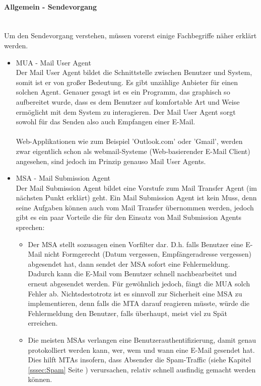 \documentclass[12pt,a4paper]{report}
\begin{document}
\begin{onehalfspace}
\paragraph{Allgemein - Sendevorgang\\\\}
Um den Sendevorgang verstehen, müssen vorerst einige Fachbegriffe näher erklärt werden.
\begin{itemize}
\item MUA - Mail User Agent\\\label{itm:MUA}
Der Mail User Agent bildet die Schnittstelle zwischen Benutzer und System, somit ist er von großer Bedeutung. Es gibt unzählige Anbieter für einen solchen Agent. Genauer gesagt ist es ein Programm, das graphisch so aufbereitet wurde, dass es dem Benutzer auf komfortable Art und Weise ermöglicht mit dem System zu interagieren. Der Mail User Agent sorgt sowohl für das Senden also auch Empfangen einer E-Mail.\\\\
Web-Applikationen wie zum Beispiel 'Outlook.com' oder 'Gmail', werden zwar eigentlich schon als webmail-Systeme (Web-basierender E-Mail Client) angesehen, sind jedoch im Prinzip genauso Mail User Agents.
\item MSA - Mail Submission Agent\\\label{itm:MSA}
Der Mail Submission Agent bildet eine Vorstufe zum Mail Transfer Agent (im nächsten Punkt erklärt) geht. Ein Mail Submission Agent ist kein Muss, denn seine Aufgaben können auch vom Mail Transfer übernommen werden, jedoch gibt es ein paar Vorteile die für den Einsatz von Mail Submission Agents sprechen:
\begin{itemize}
\item Der MSA stellt sozusagen einen Vorfilter dar. D.h. falls Benutzer eine E-Mail nicht Formgerecht (Datum vergessen, Empfängeradresse vergessen) abgesendet hat, dann sendet der MSA sofort eine Fehlermeldung. Dadurch kann die E-Mail vom Benutzer schnell nachbearbeitet und erneut abgesendet werden. Für gewöhnlich jedoch, fängt die MUA solch Fehler ab. Nichtsdestotrotz ist es sinnvoll zur Sicherheit eine MSA zu implementieren, denn falls die MTA darauf reagieren müsste, würde die Fehlermeldung den Benutzer, falls überhaupt, meist viel zu Spät erreichen.
\item Die meisten MSAs verlangen eine Benutzerauthentifizierung, damit genau protokolliert werden kann, wer, wem und wann eine E-Mail gesendet hat. Dies hilft MTAs insofern, dass Absender die Spam-Traffic (siehe Kapitel \ref{sssec:Spam} Seite \pageref{sssec:Spam}) verursachen, relativ schnell ausfindig gemacht werden können.

\end{itemize}
\end{itemize}
\end{onehalfspace}
\end{document}
